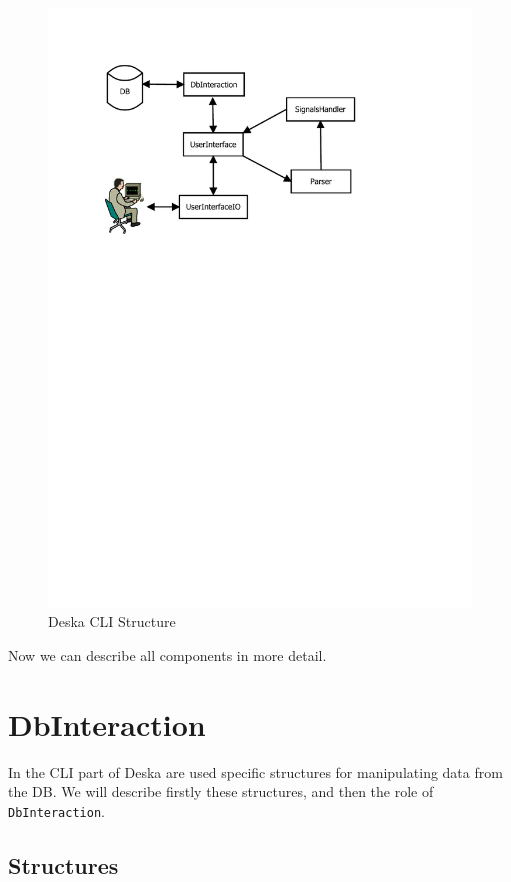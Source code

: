 \documentclass[deska]{subfiles}
\begin{document}
\begin{figure}[h]
    \centering
    \label{img:deska-cli}
    \includegraphics[trim=28mm 182mm 57mm 28mm, clip=true]{img-deska-cli.pdf}
    \caption{Deska CLI Structure}
\end{figure}

Now we can describe all components in more detail.

\section{DbInteraction}

In the CLI part of Deska are used specific structures for manipulating data from the DB. We will describe firstly 
these structures, and then the role of {\tt DbInteraction}.

\subsection{Structures}
\end{document}
